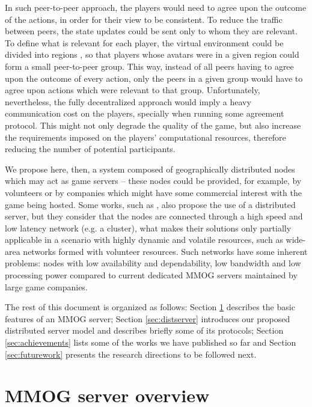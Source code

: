 \documentclass[]{usiinfprospectus}
\begin{document}
In such peer-to-peer approach, the players would need to agree upon the outcome of the actions, in order for their view to be consistent. To reduce the traffic between peers, the state updates could be sent only to whom they are relevant. To define what is relevant for each player, the virtual environment could be divided into regions \cite{schiele2007rpp}, so that players whose avatars were in a given region could form a small peer-to-peer group. This way, instead of all peers having to agree upon the outcome of every action, only the peers in a given group would have to agree upon actions which were relevant to that group. Unfortunately, nevertheless, the fully decentralized approach would imply a heavy communication cost on the players, specially when running some agreement protocol. This might not only degrade the quality of the game, but also increase the requirements imposed on the players' computational resources, therefore reducing the number of potential participants.

We propose here, then, a system composed of geographically distributed nodes which may act as game servers -- these nodes could be provided, for example, by volunteers or by companies which might have some commercial interest with the game being hosted. Some works, such as \cite{assiotis2006dam, ng2002msa, chertov2006olb, lee2003sdl}, also propose the use of a distributed server, but they consider that the nodes are connected through a high speed and low latency network (e.g. a cluster), what makes their solutions only partially applicable in a scenario with highly dynamic and volatile resources, such as wide-area networks formed with volunteer resources. Such networks have some inherent problems: nodes with low availability and dependability, low bandwidth and low processing power compared to current dedicated MMOG servers maintained by large game companies.

The rest of this document is organized as follows: Section \ref{sec:mmogserver} describes the basic features of an MMOG server; Section \ref{sec:distserver} introduces our proposed distributed server model and describes briefly some of its protocols; Section \ref{sec:achievements} lists some of the works we have published so far and Section \ref{sec:futurework} presents the research directions to be followed next. 

\section{MMOG server overview} \label{sec:mmogserver}
\end{document}
